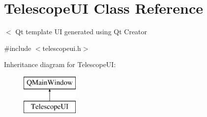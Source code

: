 \hypertarget{classTelescopeUI}{}\section{Telescope\+UI Class Reference}
\label{classTelescopeUI}


$<$ Qt template UI generated using Qt Creator  




{\ttfamily \#include $<$telescopeui.\+h$>$}

Inheritance diagram for Telescope\+UI\+:\begin{figure}[H]
\begin{center}
\leavevmode
\includegraphics[height=2.000000cm]{classTelescopeUI}
\end{center}
\end{figure}
